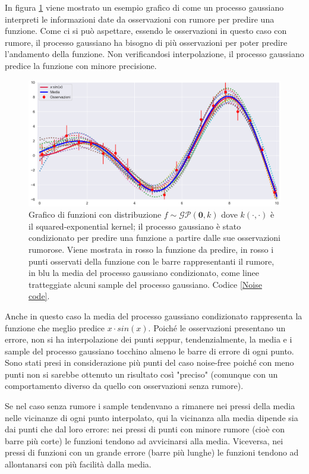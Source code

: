 In figura \ref{Noisy} viene mostrato un esempio grafico di come un processo gaussiano interpreti le informazioni date da osservazioni con rumore per predire una funzione.
Come ci si può aspettare, essendo le osservazioni in questo caso con rumore, il processo gaussiano ha bisogno di più osservazioni per poter predire l'andamento della funzione. Non verificandosi interpolazione, il processo gaussiano predice la funzione con minore precisione.
\begin{figure}[h]
    \centering
    \includegraphics[width=1\textwidth]{images/Gaussian process/Noise - mean&f(x).pdf}
    \caption{Grafico di funzioni con distribuzione $f\sim \mathcal{GP}(\bm{0},k)$ dove $k(\cdot,\cdot)$ è il squared-exponential kernel; il processo gaussiano è stato condizionato per predire una funzione a partire dalle sue osservazioni rumorose. Viene mostrata in rosso la funzione da predire, in rosso i punti osservati della funzione con le barre rappresentanti il rumore, in blu la media del processo gaussiano condizionato, come linee tratteggiate alcuni sample del processo gaussiano. Codice \ref{Noise code}.}
    \label{Noisy}
\end{figure}

\newpage

Anche in questo caso la media del processo gaussiano condizionato rappresenta la funzione che meglio predice $x\cdot sin(x)$. Poiché le osservazioni presentano un errore, non si ha interpolazione dei punti seppur, tendenzialmente, la media e i sample del processo gaussiano tocchino almeno le barre di errore di ogni punto.
Sono stati presi in considerazione più punti del caso noise-free poiché con meno punti non si sarebbe ottenuto un risultato così "preciso" (comunque con un comportamento diverso da quello con osservazioni senza rumore).

Se nel caso senza rumore i sample tendenvano a rimanere nei pressi della media nelle vicinanze di ogni punto interpolato, qui la vicinanza alla media dipende sia dai punti che dal loro errore: nei pressi di punti con minore rumore (cioè con barre più corte) le funzioni tendono ad avvicinarsi alla media. Viceversa, nei pressi di funzioni con un grande errore (barre più lunghe) le funzioni tendono ad allontanarsi con più facilità dalla media.


